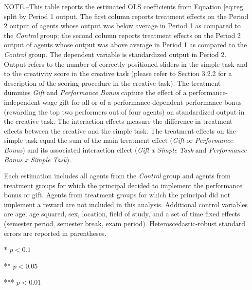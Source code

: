 \begin{table}[h]
\begin{center}
\begin{minipage}{\textwidth} \setlength{\parindent}{15pt}
\footnotesize NOTE.--This table reports the estimated OLS coefficients from Equation \ref{eq:reg} split by Period 1 output. 
The first column reports treatment effects on the Period 2 output of agents whose output was below average in Period 1 as compared to the \textit{Control} group; the second column reports treatment effects on the Period 2 output of agents whose output was above average in Period 1 as compared to the \textit{Control} group. 
The dependent variable is standardized output in Period 2. Output refers to the number of correctly positioned sliders in the simple task and to the creativity score in the creative task (please refer to Section 3.2.2 for a description of the scoring procedure in the creative task). 
The treatment dummies \textit{Gift} and \textit{Performance Bonus} capture the effect of a performance-independent wage gift for all or of a performance-dependent performance bonus (rewarding the top two performers out of four agents) on standardized output in the creative task. 
The interaction effects measure the difference in treatment effects between the creative and the simple task. The treatment effects on the simple task equal the sum of the main treatment effect (\textit{Gift} or \textit{Performance Bonus}) and its associated interaction effect (\textit{Gift x Simple Task} and \textit{Performance Bonus x Simple Task}). 

Each estimation includes all agents from the \textit{Control} group and agents from treatment groups for which the principal decided to implement the performance bonus or gift. Agents from treatment groups for which the principal did not implement a reward are not included in this analysis. 
Additional control variables are age, age squared, sex, location, field of study, and a set of time fixed effects (semester period, semester break, exam period). 
Heteroscedastic-robust standard errors are reported in parentheses. 

*   $ p < 0.1  $

**  $ p < 0.05 $

*** $ p < 0.01 $
\end{minipage}
\end{center}
\end{table}
